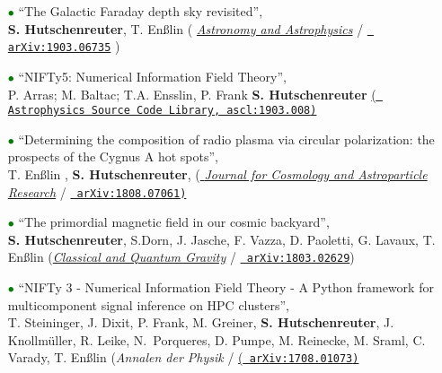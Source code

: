 \begin{itemize}
\item[\textcolor{Green}{$\bullet$}]{``The Galactic Faraday depth sky revisited'', \\
\textbf{S. Hutschenreuter}, T. En{\ss}lin ({\color{blue} \href{https://www.aanda.org/articles/aa/full_html/2020/01/aa35479-19/aa35479-19.html}{\textit{Astronomy and Astrophysics}} /  \href{https://arxiv.org/abs/1903.06735}{\texttt{{\color{blue} arXiv:1903.06735}}}} })

\vspace{6pt}

\item[\textcolor{Green}{$\bullet$}]{``NIFTy5: Numerical Information Field Theory'', \\P. Arras; M. Baltac; T.A. Ensslin, P. Frank \textbf{S. Hutschenreuter} \href{http://ascl.net/1903.008}{(\texttt{{\color{blue} Astrophysics Source Code Library, ascl:1903.008})}}}

\vspace{6pt}

\item[\textcolor{Green}{$\bullet$}]{``Determining the composition of radio plasma via circular polarization: the prospects of the Cygnus A hot spots'', \\
T. En{\ss}lin , \textbf{S. Hutschenreuter},  ({\color{blue}\href{https://iopscience.iop.org/article/10.1088/1475-7516/2019/01/035/meta}{ \textit{Journal for Cosmology and Astroparticle Research}} /
\href{https://arxiv.org/abs/1808.07061}{\texttt{{\color{blue} arXiv:1808.07061})}}}}

\vspace{6pt}

\item[\textcolor{Green}{$\bullet$}]{``The primordial magnetic field in our cosmic backyard'', \\
\textbf{S. Hutschenreuter}, S.Dorn, J. Jasche, F. Vazza, D. Paoletti, G. Lavaux, T. En{\ss}lin (\href{https://iopscience.iop.org/article/10.1088/1361-6382/aacde0}{\color{blue}\textit{Classical and Quantum Gravity}} / \href{https://arxiv.org/abs/1803.02629}{\texttt{{\color{blue} arXiv:1803.02629}}})}

\vspace{6pt}

\item[\textcolor{Green}{$\bullet$}]{``NIFTy 3 - Numerical Information Field Theory - A Python framework for multicomponent signal inference on HPC clusters'', \\
T. Steininger, J. Dixit, P. Frank, M. Greiner, \textbf{S. Hutschenreuter}, J. Knollm{\"u}ller, R. Leike, N.~Porqueres, D. Pumpe, M. Reinecke, M. Sraml, C. Varady, T. En{\ss}lin ({\color{blue}\textit{Annalen der Physik}} / \href{https://arxiv.org/abs/1708.01073}{(\texttt{{\color{blue} arXiv:1708.01073})}}}


\end{itemize}
